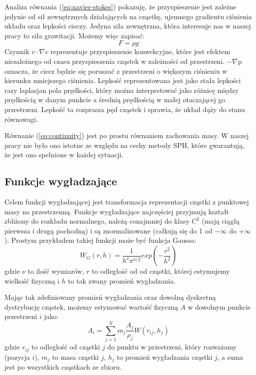 \documentclass[polish, 12pt]{aghthesis}
\begin{document}
			Analiza równania (\ref{eq:navier-stokes}) pokazuję, że przyspieszenie jest zależne jedynie od sił zewnętrznych działających na cząstkę, ujemnego gradientu ciśnienia układu oraz lepkości cieczy. Jedyna siła zewnętrzna, która interesuje nas w naszej pracy to siła grawitacji. Możemy więc zapisać: \[F={\rho}g \label {eq:gravity_force} \tag{3} \] Czynnik $v {\cdot} {\nabla} v$ reprezentuje przyspieszenie konwekcyjne, które jest efektem niezależnego od czasu przyspieszenia cząstek w zależności od przestrzeni. $-{\nabla}$p oznacza, że ciecz będzie się poruszać z przestrzeni o większym ciśnieniu w kierunku mniejszego ciśnienia. Lepkość reprezentowana jest jako stała lepkości razy laplasjan pola prędkości, który można interpretować jako różnicę między prędkością w danym punkcie a średnią prędkością w małej otaczającej go przestrzeni. Lepkość ta rozprasza pęd cząstek i sprawia, że układ dąży do stanu równowagi.
			
			Równanie (\ref{eq:continuity}) jest po prostu równaniem zachowania masy. W naszej pracy nie było ono istotne ze względu na cechy metody SPH, które gwarantują, że jest ono spełnione w każdej sytuacji.
			 
		\subsection{Funkcje wygładzające}
			
			Celem funkcji wygładzającej jest transformacja reprezentacji cząstki z punktowej masy na przestrzenną. Funkcje wygładzające najczęściej przyjmują kształt zbliżony do rozkładu normalnego, należą conajmniej do klasy ${C^2}$ (mają ciągłą pierwsza i drugą pochodną) i są znormalizowane (całkują się do 1 od $-{\infty}$ do $+{\infty}$). Prostym przykładem takiej funkcji może być funkcja Gaussa: \[W_G(r,h)=\frac{1}{h^{\nu}\pi^{{\nu}/2}}exp(-\frac{r^2}{h^2}) \label{eq:gaussian} \tag{4}\] gdzie ${\nu}$ to ilość wymiarów, $r$ to odległość od od cząstki, której estymujemy wielkość fizyczną i $h$ to tak zwany promień wygładzania.
			
			Mając tak zdefiniowany promień wygładzania oraz dowolną dyskretną dystrybucję cząstek, możemy estymować wartość fizyczną $A$ w dowolnym punkcie przestrzeni $i$ jako: \[{A}_i=\sum_{j=1}^{N}m_j\frac{A_j}{\rho_j}W(r_{ij},h_j) \label{eq:calc_all} \tag{5}\] gdzie ${r_{ij}}$ to odległość od cząstki $j$ do punktu w przestrzeni, który rozważamy (pozycja $i$), ${m_j}$ to masa cząstki $j$, ${h_j}$ to promień wygładzania cząstki $j$, a suma jest po wszystkich cząstkach ze zbioru. 
			
\end{document}
